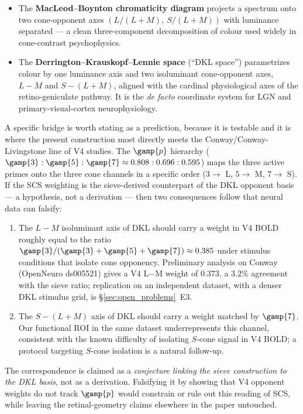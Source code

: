 \documentclass[12pt,a4paper]{article}
\begin{document}
\begin{itemize}[nosep]
\item The \textbf{MacLeod--Boynton chromaticity diagram}
  \cite{macleod1979} projects a spectrum onto two cone-opponent axes
  $(L/(L+M),\ S/(L+M))$ with luminance separated --- a clean
  three-component decomposition of colour used widely in
  cone-contrast psychophysics.
\item The \textbf{Derrington--Krauskopf--Lennie space} \cite{dkl1984}
  (``DKL space'') parametrizes colour by one luminance axis and two
  isoluminant cone-opponent axes, $L{-}M$ and $S{-}(L{+}M)$, aligned
  with the cardinal physiological axes of the retino-geniculate pathway.
  It is the \emph{de facto} coordinate system for LGN and primary-visual-cortex
  neurophysiology.
\end{itemize}

A specific bridge is worth stating as a prediction, because it is
testable and it is where the present construction most directly
meets the Conway/Conway-Livingstone line of V4 studies. The
$\gamp{p}$ hierarchy ($\gamp{3} : \gamp{5} : \gamp{7} \approx
0.808 : 0.696 : 0.595$) maps the three active primes onto the three
cone channels in a specific order ($3 \to $ L, $5 \to$ M, $7 \to$ S).
If the SCS weighting is the sieve-derived counterpart of the DKL
opponent basis --- a hypothesis, not a derivation --- then two
consequences follow that neural data can falsify:

\begin{enumerate}[nosep]
\item The $L{-}M$ isoluminant axis of DKL should carry a weight in V4
  BOLD roughly equal to the ratio $\gamp{3}/(\gamp{3}+\gamp{5}+\gamp{7})
  \approx 0.385$ under stimulus conditions that isolate cone
  opponency. Preliminary analysis on Conway~\cite{conway2025} (OpenNeuro
  ds005521) gives a V4 L$-$M weight of $0.373$, a $3.2\%$ agreement
  with the sieve ratio; replication on an independent dataset, with a
  denser DKL stimulus grid, is \S\ref{sec:open_problems}~E3.
\item The $S{-}(L{+}M)$ axis of DKL should carry a weight matched by
  $\gamp{7}$. Our functional ROI in the same dataset
  underrepresents this channel, consistent with the known
  difficulty of isolating $S$-cone signal in V4 BOLD; a protocol
  targeting $S$-cone isolation is a natural follow-up.
\end{enumerate}

The correspondence is claimed as a \emph{conjecture linking the
sieve construction to the DKL basis}, not as a derivation.
Falsifying it by showing that V4 opponent weights do not track
$\gamp{p}$ would constrain or rule out this reading of SCS, while
leaving the retinal-geometry claims elsewhere in the paper
untouched.
\end{document}
